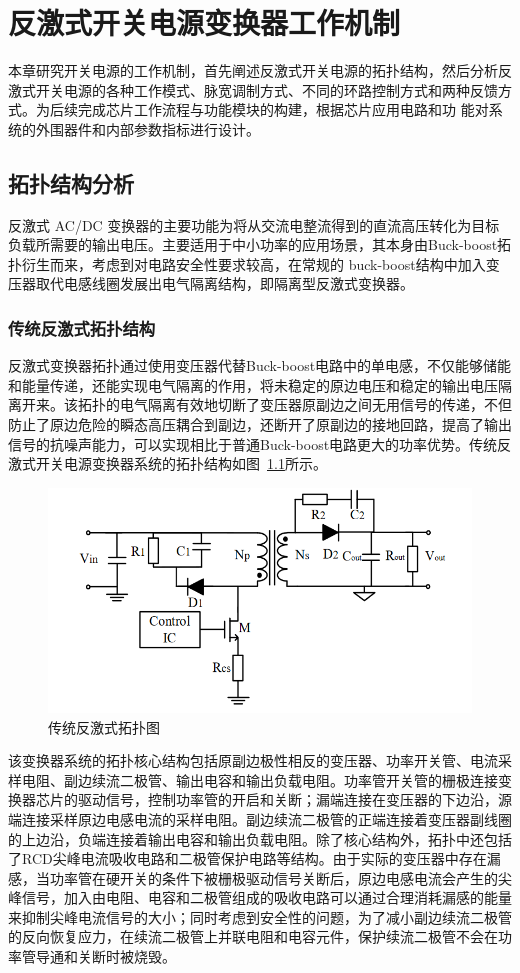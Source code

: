 \chapter{反激式开关电源变换器工作机制}
本章研究开关电源的工作机制，首先阐述反激式开关电源的拓扑结构，然后分析反激式开关电源的各种工作模式、脉宽调制方式、不同的环路控制方式和两种反馈方式。为后续完成芯片工作流程与功能模块的构建，根据芯片应用电路和功 能对系统的外围器件和内部参数指标进行设计。

\section{拓扑结构分析}
反激式 AC/DC 变换器的主要功能为将从交流电整流得到的直流高压转化为目标 负载所需要的输出电压。主要适用于中小功率的应用场景，其本身由Buck-boost拓扑衍生而来，考虑到对电路安全性要求较高，在常规的 buck-boost结构中加入变压器取代电感线圈发展出电气隔离结构，即隔离型反激式变换器。

\subsection{传统反激式拓扑结构}

反激式变换器拓扑通过使用变压器代替Buck-boost电路中的单电感，不仅能够储能和能量传递，还能实现电气隔离的作用，将未稳定的原边电压和稳定的输出电压隔离开来。该拓扑的电气隔离有效地切断了变压器原副边之间无用信号的传递，不但防止了原边危险的瞬态高压耦合到副边，还断开了原副边的接地回路，提高了输出信号的抗噪声能力，可以实现相比于普通Buck-boost电路更大的功率优势。传统反激式开关电源变换器系统的拓扑结构如图~\ref{fig:传统反激式拓扑图}所示。

\begin{figure}[htbp] 
    \centering
    \includegraphics[width=0.6\linewidth]{figures/传统反激式拓扑图.png}
    \caption{传统反激式拓扑图}
    \label{fig:传统反激式拓扑图}
\end{figure}

该变换器系统的拓扑核心结构包括原副边极性相反的变压器、功率开关管、电流采样电阻、副边续流二极管、输出电容和输出负载电阻。功率管开关管的栅极连接变换器芯片的驱动信号，控制功率管的开启和关断；漏端连接在变压器的下边沿，源端连接采样原边电感电流的采样电阻。副边续流二极管的正端连接着变压器副线圈的上边沿，负端连接着输出电容和输出负载电阻。除了核心结构外，拓扑中还包括了RCD尖峰电流吸收电路和二极管保护电路等结构。由于实际的变压器中存在漏感，当功率管在硬开关的条件下被栅极驱动信号关断后，原边电感电流会产生的尖峰信号，加入由电阻、电容和二极管组成的吸收电路可以通过合理消耗漏感的能量来抑制尖峰电流信号的大小；同时考虑到安全性的问题，为了减小副边续流二极管的反向恢复应力，在续流二极管上并联电阻和电容元件，保护续流二极管不会在功率管导通和关断时被烧毁。


